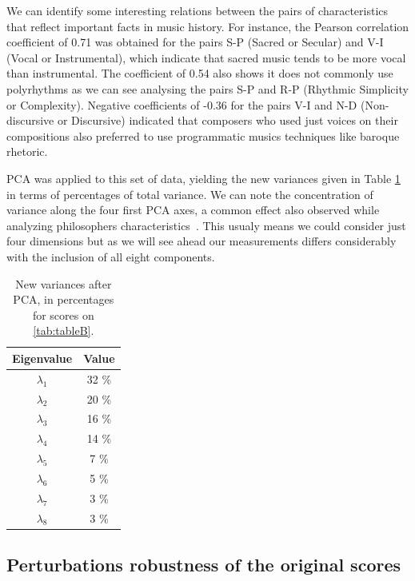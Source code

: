 \documentclass[
 aip,
 jmp,
 amsmath,amssymb,
 reprint,
]{revtex4-1}
\begin{document}
We can identify some interesting relations between the pairs of
characteristics that reflect important facts in music history. For
instance, the Pearson correlation coefficient of 0.71 was obtained for
the pairs S-P (Sacred or Secular) and V-I (Vocal or Instrumental),
which indicate that sacred music tends to be more vocal than
instrumental. The coefficient of 0.54 also shows it does not commonly use polyrhythms as we can see
analysing the pairs S-P and R-P (Rhythmic Simplicity or Complexity).
Negative coefficients of -0.36 for the pairs V-I and N-D
(Non-discursive or Discursive) indicated that composers who used
just voices on their compositions also preferred to use programmatic
musics techniques like baroque rhetoric.

PCA was applied to this set of data, yielding the new variances given
in Table \ref{tab:tableC} in terms of percentages of total variance.
We can note the concentration of variance along the four
first PCA axes, a common effect also observed while analyzing
philosophers characteristics~\cite{Fabbri}. This usualy means we could
consider just four dimensions but as we will see ahead our measurements
differs considerably with the inclusion of all eight components.

\begin{table}[ht]
\caption{\label{tab:tableC}New variances after PCA, in percentages for
  scores on \ref{tab:tableB}.}

\begin{tabular}{|c||c|}
\hline
Eigenvalue  & Value     \\ \hline

$\lambda_1$ &  32 \% \\
$\lambda_2$ &  20 \% \\
$\lambda_3$ &  16 \% \\
$\lambda_4$ &  14 \% \\
$\lambda_5$ &   7 \% \\
$\lambda_6$ &   5 \% \\
$\lambda_7$ &   3 \% \\
$\lambda_8$ &   3 \% \\
\hline

\end{tabular}
\end{table}

\subsection{Perturbations robustness of the original scores}
\end{document}
